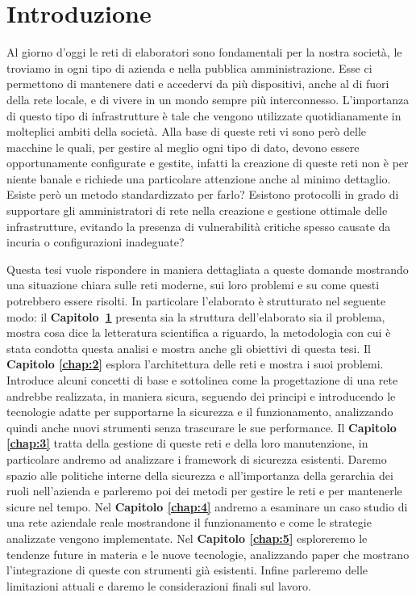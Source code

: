 \hypersetup{linkcolor=blue, citecolor=red}

\chapter{Introduzione} \label{chap:introduction}
Al giorno d'oggi le reti di elaboratori sono fondamentali per la nostra società, le troviamo in ogni tipo di azienda e nella pubblica amministrazione. Esse ci permettono di mantenere dati e accedervi da più dispositivi, anche al di fuori della rete locale, e di vivere in un mondo sempre più interconnesso.
L'importanza di questo tipo di infrastrutture è tale che vengono utilizzate quotidianamente in molteplici ambiti della società.
Alla base di queste reti vi sono però delle macchine le quali, per gestire al meglio ogni tipo di dato, devono essere opportunamente configurate e gestite, infatti la creazione di queste reti non è per niente banale e richiede una particolare attenzione anche al minimo dettaglio.
Esiste però un metodo standardizzato per farlo? Esistono protocolli in grado di supportare gli amministratori di rete nella creazione e gestione ottimale delle infrastrutture, evitando la presenza di vulnerabilità critiche spesso causate da incuria o configurazioni inadeguate?

Questa tesi vuole rispondere in maniera dettagliata a queste domande mostrando una situazione chiara sulle reti moderne, sui loro problemi e su come questi potrebbero essere risolti.
In particolare l'elaborato è strutturato nel seguente modo: il \textbf{Capitolo~\ref{chap:introduction}} presenta sia la struttura dell'elaborato sia il problema, mostra cosa dice la letteratura scientifica a riguardo, la metodologia con cui è stata condotta questa analisi e mostra anche gli obiettivi di questa tesi.
Il \textbf{Capitolo \ref{chap:2}} esplora l'architettura delle reti e mostra i suoi problemi. Introduce alcuni concetti di base e sottolinea come la progettazione di una rete andrebbe realizzata, in maniera sicura, seguendo dei principi e introducendo le tecnologie adatte per supportarne la sicurezza e il funzionamento, analizzando quindi anche nuovi strumenti senza trascurare le sue performance. Il \textbf{Capitolo \ref{chap:3}} tratta della gestione di queste reti e della loro manutenzione, in particolare andremo ad analizzare i framework di sicurezza esistenti. Daremo spazio alle politiche interne della sicurezza e all'importanza della gerarchia dei ruoli nell'azienda e parleremo poi dei metodi per gestire le reti e per mantenerle sicure nel tempo. 
Nel \textbf{Capitolo \ref{chap:4}} andremo a esaminare un caso studio di 
una rete aziendale reale mostrandone il funzionamento e come le strategie analizzate vengono implementate. Nel \textbf{Capitolo \ref{chap:5}} esploreremo le tendenze future in materia e le nuove tecnologie, analizzando paper che mostrano l'integrazione di queste con strumenti già esistenti. Infine parleremo delle limitazioni attuali e daremo le considerazioni finali sul lavoro.



